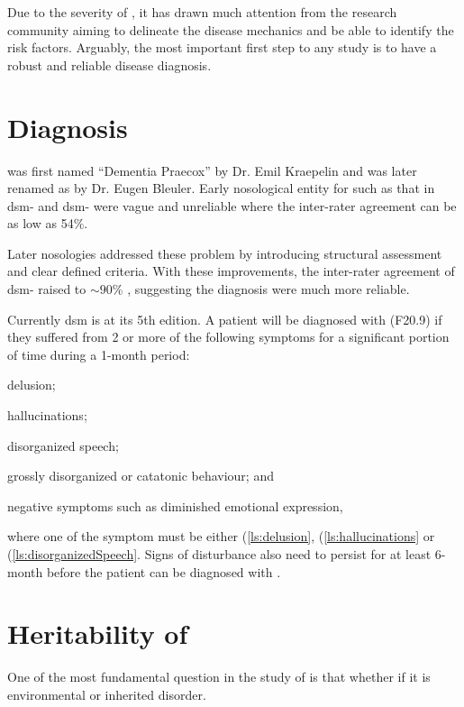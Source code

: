 \documentclass{book}
\newcommand{\rom}[1]{\uppercase\expandafter{\romannumeral #1\relax}}
\begin{document}
	Due to the severity of , it has drawn much attention from the research community aiming to delineate the disease mechanics and be able to identify the risk factors.
	Arguably, the most important first step to any  study is to have a robust and reliable disease diagnosis.
	
	\section{Diagnosis}
	 was first named ``Dementia Praecox'' by Dr. Emil Kraepelin and was later renamed as  by Dr. Eugen Bleuler\citep{Jablensky2010}.
	Early nosological entity for  such as that in \gls{dsm}-\rom{1} and \gls{dsm}-\rom{2} were vague and unreliable where the inter-rater agreement can be as low as 54$\%$.\citep{Tsuang2000,Harvey2012} 
	
	Later nosologies addressed these problem by introducing structural assessment and clear defined criteria. 
	With these improvements, the inter-rater agreement of \gls{dsm}-\rom{3} raised to $\sim 90\%$ \citep{Harvey2012}, suggesting the diagnosis were much more reliable.
	
	Currently \gls{dsm} is at its 5th edition\citep{AmericanPsychiatricAssociation2013}. 
	A patient will be diagnosed with (F20.9) if they suffered from 2 or more of the following symptoms for a significant portion of time during a 1-month period: 
	\begin{enumerate*}[label=\arabic*\upshape)]
		\item delusion; \label{ls:delusion}
		\item hallucinations;\label{ls:hallucinations}
		\item disorganized speech;\label{ls:disorganizedSpeech}
		\item grossly disorganized or catatonic behaviour; and\label{ls:catatonicBehavior}
		\item negative symptoms such as diminished emotional expression,\label{ls:negativeSymptoms}
	\end{enumerate*}  where one of the symptom must be either (\ref{ls:delusion}, (\ref{ls:hallucinations} or (\ref{ls:disorganizedSpeech}.
	Signs of disturbance also need to persist for at least 6-month before the patient can be diagnosed with .
	
	\section{Heritability of }
	One of the most fundamental question in the study of  is that whether if it is environmental or inherited disorder.
	
\end{document}
